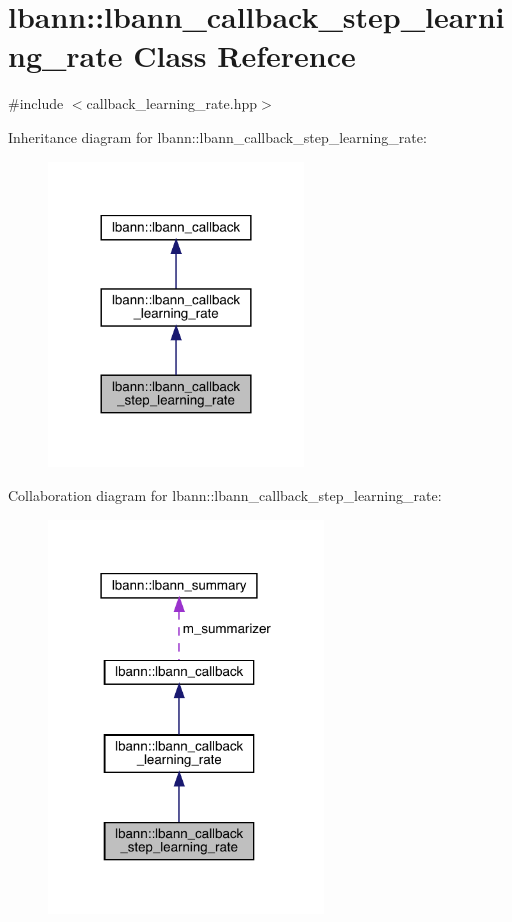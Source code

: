 \hypertarget{classlbann_1_1lbann__callback__step__learning__rate}{}\section{lbann\+:\+:lbann\+\_\+callback\+\_\+step\+\_\+learning\+\_\+rate Class Reference}
\label{classlbann_1_1lbann__callback__step__learning__rate}


{\ttfamily \#include $<$callback\+\_\+learning\+\_\+rate.\+hpp$>$}



Inheritance diagram for lbann\+:\+:lbann\+\_\+callback\+\_\+step\+\_\+learning\+\_\+rate\+:\nopagebreak
\begin{figure}[H]
\begin{center}
\leavevmode
\includegraphics[width=192pt]{classlbann_1_1lbann__callback__step__learning__rate__inherit__graph}
\end{center}
\end{figure}


Collaboration diagram for lbann\+:\+:lbann\+\_\+callback\+\_\+step\+\_\+learning\+\_\+rate\+:\nopagebreak
\begin{figure}[H]
\begin{center}
\leavevmode
\includegraphics[width=207pt]{classlbann_1_1lbann__callback__step__learning__rate__coll__graph}
\end{center}
\end{figure}
